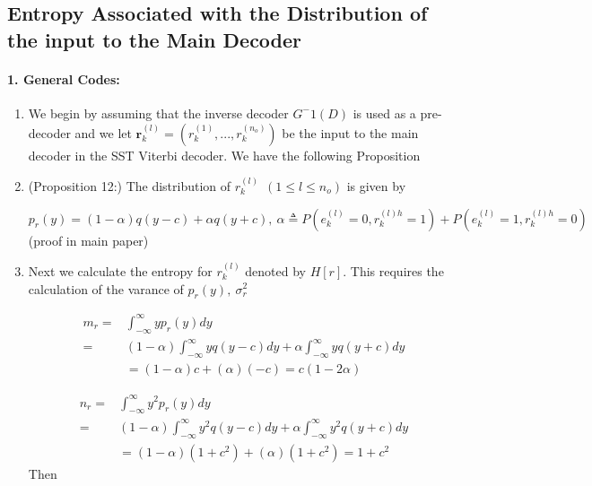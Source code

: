 \documentclass[fontsize=12pt]{article}
\theoremstyle{definition}
\begin{document}
\subsection{Entropy Associated with the Distribution of the input to the Main Decoder}
\paragraph{1. General Codes:}

\begin{enumerate}
\item We begin by assuming that the inverse decoder $G^-1(D)$ is used as a pre-decoder and we let $\mathbf{r}_k^{(l)} =(r_k^{(1)},...,r_k^{(n_o)})$ be the input to the main decoder in the SST Viterbi decoder. We have the following Proposition

\item (Proposition 12:) The distribution of $r_k^{(l)}~~(1 \leq l \leq n_o)$ is given by

\begin{equation}
p_r(y) = (1-\alpha)q(y-c) + \alpha q(y+c),~ \alpha \triangleq P(e_k^{(l)} = 0, r_k^{(l)h} =1) + P(e_k^{(l)} = 1, r_k^{(l)h} =0)
\end{equation}
(proof in main paper)

\item Next we calculate the entropy for $r_k^{(l)} 
$ denoted by $H[r]$. This requires the calculation of the varance of $p_r(y),~\sigma_r^2$

\begin{equation*}
\begin{aligned}
m_r = &\int_{-\infty}^{\infty} yp_r(y) dy \\
=&(1-\alpha) \int_{-\infty}^{\infty} yq(y-c) dy + \alpha\int_{-\infty}^{\infty} yq(y+c) dy\\
&=(1-\alpha)c +(\alpha)(-c) = c(1-2\alpha)
\end{aligned}
\end{equation*}

\begin{equation*}
\begin{aligned}
n_r = &\int_{-\infty}^{\infty} y^2p_r(y) dy \\
=&(1-\alpha) \int_{-\infty}^{\infty} y^2q(y-c) dy + \alpha\int_{-\infty}^{\infty} y^2q(y+c) dy\\
&=(1-\alpha)(1+c^2) +(\alpha)(1+c^2) = 1+c^2
\end{aligned}
\end{equation*}
Then 


\end{enumerate}
\end{document}
